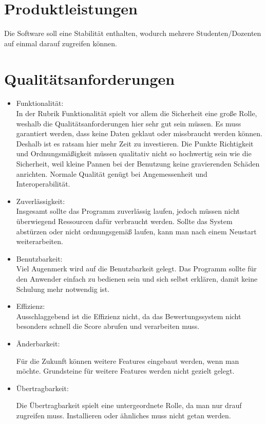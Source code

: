 \documentclass[a4paper,listof=leveldown,listof=numbered]{scrreprt}
\begin{document}
\chapter{Produktleistungen}
	Die Software soll eine Stabilität enthalten, wodurch mehrere Studenten/Dozenten auf einmal darauf zugreifen können.
	
\chapter{Qualitätsanforderungen}
	
	
	
	
	\begin{itemize}
		\item Funktionalität:\\
		In der Rubrik Funktionalität spielt vor allem die Sicherheit eine große Rolle, weshalb die Qualitätsanforderungen hier sehr gut sein müssen. Es muss garantiert werden, dass keine Daten geklaut oder missbraucht werden können. Deshalb ist es ratsam hier mehr Zeit zu investieren. Die Punkte Richtigkeit und Ordnungsmäßigkeit müssen qualitativ nicht so hochwertig sein wie die Sicherheit, weil kleine Pannen bei der Benutzung keine gravierenden Schäden anrichten. Normale Qualität genügt bei Angemessenheit und Interoperabilität.\\
		
		\item Zuverlässigkeit:\\
		Insgesamt sollte das Programm zuverlässig laufen, jedoch müssen nicht überwiegend Ressourcen dafür verbraucht werden. Sollte das System abstürzen oder nicht ordnungsgemäß laufen, kann man nach einem Neustart weiterarbeiten.\\
		
		\item Benutzbarkeit:\\
		Viel Augenmerk wird auf die Benutzbarkeit gelegt. Das Programm sollte für den Anwender einfach zu bedienen sein und sich selbst erklären, damit keine Schulung mehr notwendig ist. \\
		
		\item 	Effizienz:\\
		Ausschlaggebend ist die Effizienz nicht, da das Bewertungssystem nicht besonders schnell die Score abrufen und verarbeiten muss. \\
		
		\item Änderbarkeit:
		
		Für die Zukunft können weitere Features eingebaut werden, wenn man möchte. Grundsteine für weitere Features werden nicht gezielt gelegt.\\
		
			
		\item  Übertragbarkeit:
		
		Die Übertragbarkeit spielt eine untergeordnete Rolle, da man nur drauf zugreifen muss. Installieren oder ähnliches muss nicht getan werden. \\
			
	\end{itemize}
	
\end{document}
